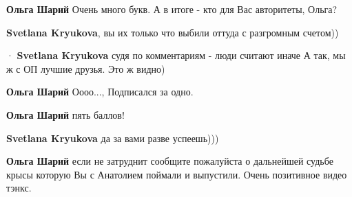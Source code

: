 \begin{itemize}
\begin{itemize}
\textbf{Ольга Шарий} Очень много букв. А в итоге - кто для Вас авторитеты, Ольга?

 
\textbf{Svetlana Kryukova}, вы их только что выбили оттуда с разгромным счетом))

 
  · 
\textbf{Svetlana Kryukova} судя по комментариям - люди считают иначе \Laughey[1.0][white]А так, мы ж с ОП лучшие друзья. Это ж видно)

 
\textbf{Ольга Шарий} Оооо..., Подписался за одно.

 
\textbf{Ольга Шарий} пять баллов!

 
\textbf{Svetlana Kryukova} да за вами разве успеешь)))

 
\textbf{Ольга Шарий} если не затруднит сообщите пожалуйста о дальнейшей судьбе крысы которую Вы с Анатолием поймали и выпустили. Очень позитивное видео тэнкс.

 

\end{itemize}
\end{itemize}
